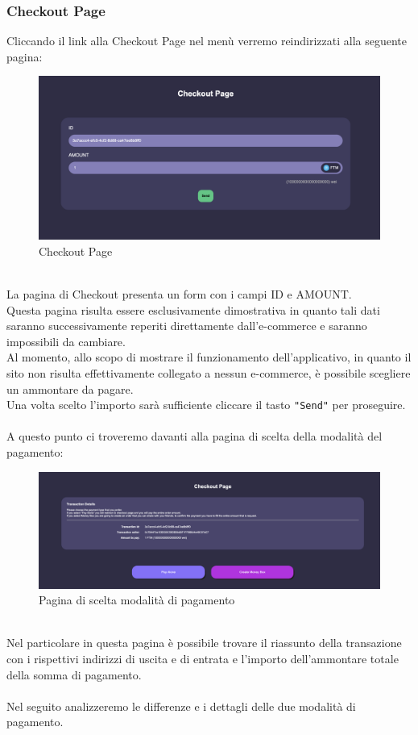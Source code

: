         \subsubsection{Checkout Page}
        Cliccando il link alla Checkout Page nel menù verremo reindirizzati alla seguente pagina:
        \begin{figure}[H]
            \centering
            \includegraphics[scale=0.3]{immagini/Checkout/Checkout.png}
            \caption{Checkout Page}
        \end{figure}
        \textbf{}\\
        La pagina di Checkout presenta un form con i campi ID e AMOUNT.\\
        Questa pagina risulta essere esclusivamente dimostrativa in quanto tali dati saranno successivamente reperiti direttamente dall'e-commerce\glo{} e saranno impossibili da cambiare.\\
        Al momento, allo scopo di mostrare il funzionamento dell'applicativo, in quanto il sito non risulta effettivamente collegato a nessun e-commerce\glo{}, è possibile scegliere un ammontare da pagare. \\
        Una volta scelto l'importo sarà sufficiente cliccare il tasto \texttt{"Send"} per proseguire.\\\\
        A questo punto ci troveremo davanti alla pagina di scelta della modalità del pagamento:
        \begin{figure}[H]
            \centering
            \includegraphics[scale=0.2]{immagini/Checkout/PaymentMode.png}
            \caption{Pagina di scelta modalità di pagamento}
        \end{figure}
        \textbf{}\\
        Nel particolare in questa pagina è possibile trovare il riassunto della transazione con i rispettivi indirizzi di uscita e di entrata e l'importo dell'ammontare totale della somma di pagamento.\\\\
        Nel seguito analizzeremo le differenze e i dettagli delle due modalità di pagamento.
